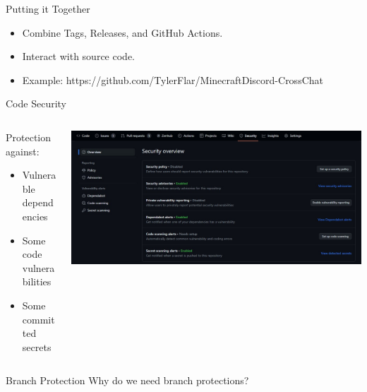 \documentclass[aspectratio=169]{beamer}
\begin{document}
\begin{frame}{Putting it Together}
    \begin{itemize}
        \item Combine Tags, Releases, and GitHub Actions.
        \item Interact with source code.
        \item Example: https://github.com/TylerFlar/MinecraftDiscord-CrossChat
    \end{itemize}
\end{frame}
\begin{frame}{Code Security}
    \begin{columns}
        \begin{column}{0.4\textwidth}
            Protection against:
            \begin{itemize}
                \item Vulnerable dependencies
                \item Some code vulnerabilities
                \item Some committed secrets
            \end{itemize}
        \end{column}
        \begin{column}{0.6\textwidth}
            \includegraphics[width=\textwidth,height=0.8\textheight,keepaspectratio]{github_security.jpg}
        \end{column}
    \end{columns}
\end{frame}
\begin{frame}{Branch Protection}
    Why do we need branch protections?
\end{frame}
\end{document}
